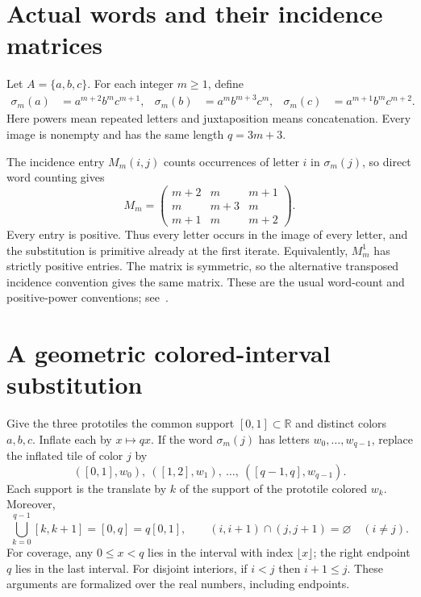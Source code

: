 \documentclass[11pt,a4paper]{article}
\newcommand{\R}{\mathbb R}
\begin{document}
\section{Actual words and their incidence matrices}
Let $A=\{a,b,c\}$. For each integer $m\ge1$, define
\begin{equation}\label{eq:words}
\begin{aligned}
\sigma_m(a)&=a^{m+2}b^mc^{m+1},&
\sigma_m(b)&=a^mb^{m+3}c^m,&
\sigma_m(c)&=a^{m+1}b^mc^{m+2}.
\end{aligned}
\end{equation}
Here powers mean repeated letters and juxtaposition means concatenation. Every image is nonempty and has the same length $q=3m+3$.

\newpage
The incidence entry $M_m(i,j)$ counts occurrences of letter $i$ in $\sigma_m(j)$, so direct word counting gives
\begin{equation}\label{eq:matrix}
M_m=\begin{pmatrix}
m+2&m&m+1\\
m&m+3&m\\
m+1&m&m+2
\end{pmatrix}.
\end{equation}
Every entry is positive. Thus every letter occurs in the image of every letter, and the substitution is primitive already at the first iterate. Equivalently, $M_m^1$ has strictly positive entries. The matrix is symmetric, so the alternative transposed incidence convention gives the same matrix. These are the usual word-count and positive-power conventions; see~\cite{berlinkov}.

\section{A geometric colored-interval substitution}
Give the three prototiles the common support $[0,1]\subset\R$ and distinct colors $a,b,c$. Inflate each by $x\mapsto qx$. If the word $\sigma_m(j)$ has letters $w_0,\ldots,w_{q-1}$, replace the inflated tile of color $j$ by
\[
([0,1],w_0),\ ([1,2],w_1),\ \ldots,\ ([q-1,q],w_{q-1}).
\]
Each support is the translate by $k$ of the support of the prototile colored $w_k$. Moreover,
\[
\bigcup_{k=0}^{q-1}[k,k+1]=[0,q]=q[0,1],
\qquad (i,i+1)\cap(j,j+1)=\varnothing\quad(i\ne j).
\]
For coverage, any $0\le x<q$ lies in the interval with index $\lfloor x\rfloor$; the right endpoint $q$ lies in the last interval. For disjoint interiors, if $i<j$ then $i+1\le j$. These arguments are formalized over the real numbers, including endpoints.
\end{document}
